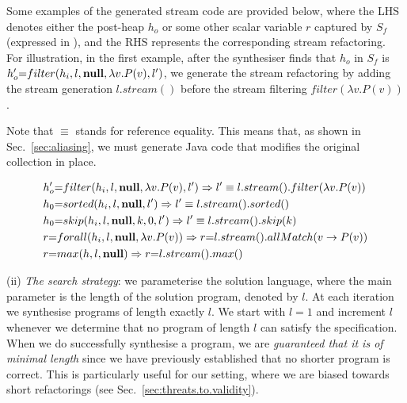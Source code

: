 \documentclass[runningheads,a4paper]{llncs}
\begin{document}
Some examples of the generated stream code are provided below, where
the LHS denotes either the post-heap $h_o$  or 
some other scalar variable $r$  captured by $S_f$ 
(expressed in \logic), and the RHS represents the corresponding stream refactoring.
For illustration, in the first example, 
after the synthesiser finds that $h_o$ in $S_f$ is 
$h_o'{=}filter(h_i,l, \mathbf{null},\lambda v.P(v),l')$,
we generate the stream refactoring by 
adding the stream generation $l.stream()$ 
before the stream filtering $filter(\lambda v.P(v))$.

Note that $\equiv$ stands for reference equality.
This means that, as shown in Sec.~\ref{sec:aliasing}, 
we must generate Java code that modifies the original collection in place.
%

{\small
\begin{alignat*}{2}
&  h_o'{=}filter(h_i,l, \mathbf{null},\lambda v.P(v),l') \Rightarrow l' \equiv l.stream().filter(\lambda v.P(v))\\
& h_0{=}sorted(h_i,l, \mathbf{null},l') \Rightarrow l'\equiv l.stream().sorted()    \\
& h_0{=}skip(h_i,l,\mathbf{null}, k, 0, l')    \Rightarrow l'\equiv l.stream().skip(k) \\
& r {=} forall(h_i,l, \mathbf{null}, \lambda v.P(v))  \Rightarrow r {=} l.stream().allMatch(v \rightarrow P(v)) \\
& r {=} max(h, l, \mathbf{null})   \Rightarrow  r {=} l.stream().max()
\end{alignat*}
}

(ii) {\em The search strategy}: we parameterise the solution language, %
where the main parameter is the length of the
solution program, denoted by $l$.  At each iteration we synthesise
programs of length exactly $l$.  We start with $l = 1$ and increment
$l$ whenever we determine that no program of length $l$ can satisfy
the specification.  When we do successfully synthesise a program, we
are \emph{guaranteed that it is of minimal length} since we have
previously established that no shorter program is correct.
%
This is particularly useful for
our setting, where we are biased towards short refactorings (see
Sec.~\ref{sec:threats.to.validity}).
\end{document}
